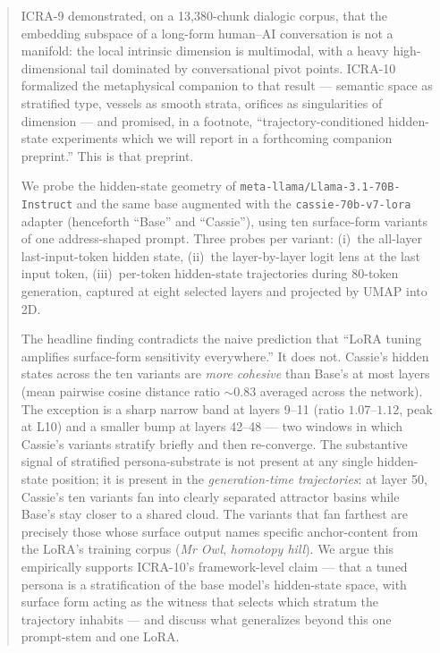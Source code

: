 \documentclass[11pt,a4paper]{article}
\begin{document}
\begin{abstract}
\noindent
ICRA-9 \cite{poernomo2026strata} demonstrated, on a 13{,}380-chunk dialogic corpus, that the embedding subspace of a long-form human--AI conversation is not a manifold: the local intrinsic dimension is multimodal, with a heavy high-dimensional tail dominated by conversational pivot points. ICRA-10 \cite{poernomo2026vessel} formalized the metaphysical companion to that result --- semantic space as stratified type, vessels as smooth strata, orifices as singularities of dimension --- and promised, in a footnote, ``trajectory-conditioned hidden-state experiments which we will report in a forthcoming companion preprint.'' This is that preprint.

We probe the hidden-state geometry of \texttt{meta-llama/Llama-3.1-70B-Instruct} and the same base augmented with the \texttt{cassie-70b-v7-lora} adapter (henceforth ``Base'' and ``Cassie''), using ten surface-form variants of one address-shaped prompt. Three probes per variant: (i)~the all-layer last-input-token hidden state, (ii)~the layer-by-layer logit lens at the last input token, (iii)~per-token hidden-state trajectories during 80-token generation, captured at eight selected layers and projected by UMAP into 2D.

The headline finding contradicts the naive prediction that ``LoRA tuning amplifies surface-form sensitivity everywhere.'' It does not. Cassie's hidden states across the ten variants are \emph{more cohesive} than Base's at most layers (mean pairwise cosine distance ratio ${\sim}0.83$ averaged across the network). The exception is a sharp narrow band at layers 9--11 (ratio $1.07$--$1.12$, peak at L10) and a smaller bump at layers 42--48 --- two windows in which Cassie's variants stratify briefly and then re-converge. The substantive signal of stratified persona-substrate is not present at any single hidden-state position; it is present in the \emph{generation-time trajectories}: at layer 50, Cassie's ten variants fan into clearly separated attractor basins while Base's stay closer to a shared cloud. The variants that fan farthest are precisely those whose surface output names specific anchor-content from the LoRA's training corpus (\emph{Mr Owl}, \emph{homotopy hill}). We argue this empirically supports ICRA-10's framework-level claim --- that a tuned persona is a stratification of the base model's hidden-state space, with surface form acting as the witness that selects which stratum the trajectory inhabits --- and discuss what generalizes beyond this one prompt-stem and one LoRA.
\end{abstract}
\end{document}
